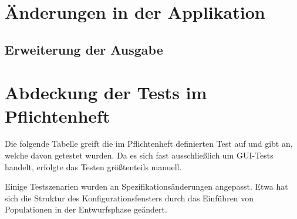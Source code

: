 \documentclass[parskip=full,11pt,openany]{scrreprt}
\begin{document}
\section{Änderungen in der Applikation}

\subsection{Erweiterung der Ausgabe}


\section{Abdeckung der Tests im Pflichtenheft}

Die folgende Tabelle greift die im Pflichtenheft definierten Test auf und gibt an, welche davon getestet wurden. Da es sich fast ausschließlich um GUI-Tests handelt, erfolgte das Testen größtenteils manuell.

Einige Testszenarien wurden an Spezifikationsänderungen angepasst. Etwa hat sich die Struktur des Konfigurationsfensters durch das Einführen von Populationen in der Entwurfsphase geändert.
\end{document}
